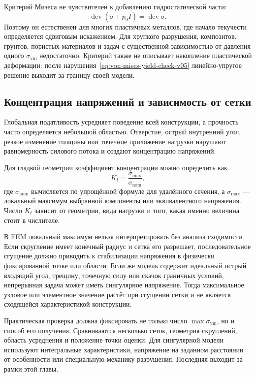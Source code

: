 Критерий Мизеса не чувствителен к добавлению гидростатической части:
\[
 \operatorname{dev}(\sigma+p_0I)=\operatorname{dev}\sigma.
\]
Поэтому он естественен для многих пластичных металлов, где начало текучести определяется сдвиговым искажением. Для хрупкого разрушения, композитов, грунтов, пористых материалов и задач с существенной зависимостью от давления одного $\sigma_{\mathrm{vm}}$ недостаточно. Критерий также не описывает накопление пластической деформации: после нарушения~\eqref{eq:von-mises-yield-check-v05} линейно-упругое решение выходит за границу своей модели.

\subsection{Концентрация напряжений и зависимость от сетки}

Глобальная податливость усредняет поведение всей конструкции, а прочность часто определяется небольшой областью. Отверстие, острый внутренний угол, резкое изменение толщины или точечное приложение нагрузки нарушают равномерность силового потока и создают концентрацию напряжений.

Для гладкой геометрии коэффициент концентрации можно определить как
\begin{equation}
\label{eq:stress-concentration-factor-v05}
 K_t
 =\frac{\sigma_{\max}}{\sigma_{\mathrm{nom}}},
\end{equation}
где $\sigma_{\mathrm{nom}}$ вычисляется по упрощённой формуле для удалённого сечения, а $\sigma_{\max}$ --- локальный максимум выбранной компоненты или эквивалентного напряжения. Число $K_t$ зависит от геометрии, вида нагрузки и того, какая именно величина стоит в числителе.

В FEM локальный максимум нельзя интерпретировать без анализа сходимости. Если скругление имеет конечный радиус и сетка его разрешает, последовательное сгущение должно приводить к стабилизации напряжения в физически фиксированной точке или области. Если же модель содержит идеальный острый входящий угол, трещину, точечную силу или скачок граничных условий, непрерывная задача может иметь сингулярное напряжение. Тогда максимальное узловое или элементное значение растёт при сгущении сетки и не является сходящейся характеристикой конструкции.

Практическая проверка должна фиксировать не только число $\max\sigma_{\mathrm{vm}}$, но и способ его получения. Сравниваются несколько сеток, геометрия скруглений, область усреднения и положение точки оценки. Для сингулярной модели используют интегральные характеристики, напряжение на заданном расстоянии от особенности или специальную механику разрушения. Последняя выходит за рамки этой главы.

